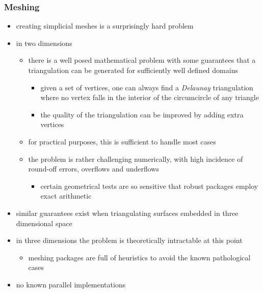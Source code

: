 \begin{frame}[fragile]
%
  \frametitle{Meshing}
%
  \begin{itemize}
%
  \item creating simplicial meshes is a surprisingly hard problem
%
  \item in two dimensions
    \begin{itemize}
    \item there is a well posed mathematical problem with some guarantees that a triangulation
      can be generated for sufficiently well defined domains
      \begin{itemize}
      \item given a set of vertices, one can always find a {\em Delaunay} triangulation where
        no vertex falls in the interior of the circumcircle of any triangle
      \item the quality of the triangulation can be improved by adding extra vertices
      \end{itemize}
    \item for practical purposes, this is sufficient to handle most cases
    \item the problem is rather challenging numerically, with high incidence of round-off
      errors, overflows and underflows
      \begin{itemize}
      \item certain geometrical tests are so sensitive that robust packages employ exact
        arithmetic
      \end{itemize}

    \end{itemize}
%
  \item similar guarantees exist when triangulating surfaces embedded in three dimensional
    space
%
  \item in three dimensions the problem is theoretically intractable at this point
    \begin{itemize}
    \item meshing packages are full of heuristics to avoid the known pathological cases
    \end{itemize}
%
  \item no known parallel implementations 
%
  \end{itemize}
%
\end{frame}

